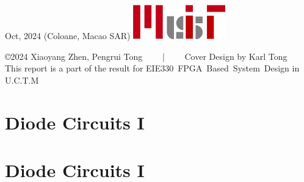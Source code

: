 \documentclass[a4paper,11pt]{article}
\begin{document}
\begin{titlepage}
    \vspace*{\fill}
		Oct, 2024\newline 
        (Coloane, Macao SAR)
        \vspace{0.7\baselineskip}\newline
        \includegraphics[width = 40mm]{../../Report_Resources/MUIT_origin.png}\par
        {\small \copyright 2024 Xiaoyang Zhen, Pengrui Tong ~~~~|~~~~ Cover Design by Karl Tong}\\[0.25pt]
        {\small This report is a part of the result for}
        {\small EIE330~FPGA~Based~System~Design in U.C.T.M}\\[0.25pt]

\end{titlepage}
\blankpage

\tableofcontents
\newpage

\section{Diode Circuits I}
%
\lipsum[2-4]\par
\lipsum[2-4]

\section{Diode Circuits I}
\end{document}

